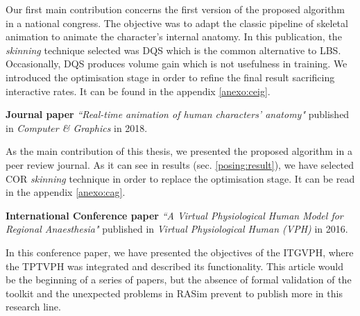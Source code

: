 Our first main contribution concerns the first version of the proposed algorithm in a national congress. The objective was to adapt the classic pipeline of skeletal animation to animate the character's internal anatomy. In this publication, the \emph{skinning} technique selected was \acs{DQS} which is the common alternative to \acs{LBS}. Occasionally, \acs{DQS} produces volume gain which is not usefulness in training. We introduced the optimisation stage in order to refine the final result sacrificing interactive rates.  It can be found in the appendix \ref{anexo:ceig}.


\textbf{Journal paper }\emph{``Real-time animation of human characters' anatomy"}\cite{SUJAR2018268} published in \emph{Computer \& Graphics} in 2018. 

As the main contribution of this thesis, we presented the proposed algorithm in a peer review journal. As it can see in results (sec. \ref{posing:result}), we have selected \acs{COR} \emph{skinning} technique in order to replace the optimisation stage. It can be read in the appendix \ref{anexo:cag}.

\textbf{International Conference paper }\emph{``A Virtual Physiological Human Model for Regional Anaesthesia"}\cite{VHZKLBSGSD16} published in \emph{Virtual Physiological Human (VPH)} in 2016.

In this conference paper, we have presented the objectives of the \acs{ITGVPH}, where the \acs{TPTVPH} was integrated and described its functionality. This article would be the beginning of a series of papers, but the absence of formal validation of the toolkit and the unexpected problems in \acs{RASim} prevent to publish more in this research line.

